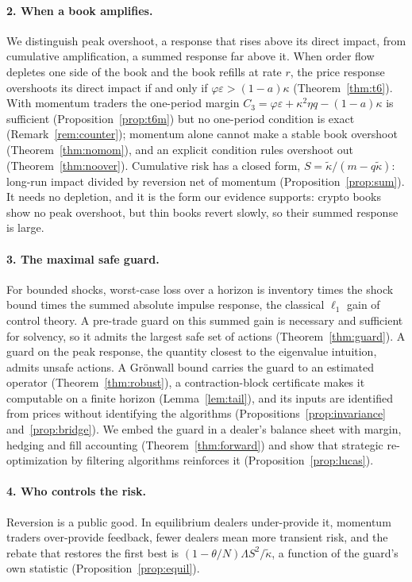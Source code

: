 \documentclass[12pt]{article}
\theoremstyle{definition}
\theoremstyle{remark}
\begin{document}
\paragraph{2. When a book amplifies.} We distinguish peak overshoot, a response that rises above its direct impact, from cumulative amplification, a summed response far above it. When order flow depletes one side of the book and the book refills at rate $r$, the price response overshoots its direct impact if and only if $\varphi\varepsilon>(1-a)\kappa$ (Theorem~\ref{thm:t6}). With momentum traders the one-period margin $C_3=\varphi\varepsilon+\kappa^2\eta q-(1-a)\kappa$ is sufficient (Proposition~\ref{prop:t6m}) but no one-period condition is exact (Remark~\ref{rem:counter}); momentum alone cannot make a stable book overshoot (Theorem~\ref{thm:nomom}), and an explicit condition rules overshoot out (Theorem~\ref{thm:noover}). Cumulative risk has a closed form, $S=\tilde\kappa/(m-q\tilde\kappa)$: long-run impact divided by reversion net of momentum (Proposition~\ref{prop:sum}). It needs no depletion, and it is the form our evidence supports: crypto books show no peak overshoot, but thin books revert slowly, so their summed response is large.

\paragraph{3. The maximal safe guard.} For bounded shocks, worst-case loss over a horizon is inventory times the shock bound times the summed absolute impulse response, the classical $\ell_1$ gain of control theory. A pre-trade guard on this summed gain is necessary and sufficient for solvency, so it admits the largest safe set of actions (Theorem~\ref{thm:guard}). A guard on the peak response, the quantity closest to the eigenvalue intuition, admits unsafe actions. A Gr\"onwall bound carries the guard to an estimated operator (Theorem~\ref{thm:robust}), a contraction-block certificate makes it computable on a finite horizon (Lemma~\ref{lem:tail}), and its inputs are identified from prices without identifying the algorithms (Propositions~\ref{prop:invariance} and~\ref{prop:bridge}). We embed the guard in a dealer's balance sheet with margin, hedging and fill accounting (Theorem~\ref{thm:forward}) and show that strategic re-optimization by filtering algorithms reinforces it (Proposition~\ref{prop:lucas}).

\paragraph{4. Who controls the risk.} Reversion is a public good. In equilibrium dealers under-provide it, momentum traders over-provide feedback, fewer dealers mean more transient risk, and the rebate that restores the first best is $(1-\theta/N)\Lambda S^2/\tilde\kappa$, a function of the guard's own statistic (Proposition~\ref{prop:equil}).
\end{document}

